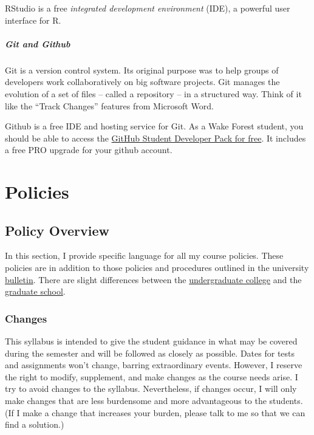 RStudio is a free \emph{integrated development environment} (IDE), a powerful user interface for R.

\hypertarget{git-and-github}{%
\subsubsection{Git and Github}\label{git-and-github}}

Git is a version control system. Its original purpose was to help groups of developers work collaboratively on big software projects. Git manages the evolution of a set of files -- called a repository -- in a structured way. Think of it like the ``Track Changes'' features from Microsoft Word.

Github is a free IDE and hosting service for Git. As a Wake Forest student, you should be able to access the \href{https://education.github.com/benefits?type=student}{GitHub Student Developer Pack for free}. It includes a free PRO upgrade for your github account.

\hypertarget{part-policies}{%
\part*{Policies}\label{part-policies}}


\hypertarget{policy-overview}{%
\chapter{Policy Overview}\label{policy-overview}}

In this section, I provide specific language for all my course policies. These policies are in addition to those policies and procedures outlined in the university \href{https://bulletin.wfu.edu}{bulletin}. There are slight differences between the \href{https://bulletin.wfu.edu/undergraduate/}{undergraduate college} and the \href{https://bulletin.wfu.edu/graduate/}{graduate school}.

\hypertarget{changes}{%
\section{Changes}\label{changes}}

This syllabus is intended to give the student guidance in what may be covered during the semester and will be followed as closely as possible.
Dates for tests and assignments won't change, barring extraordinary events.
However, I reserve the right to modify, supplement, and make changes as the course needs arise.
I try to avoid changes to the syllabus.
Nevertheless, if changes occur, I will only make changes that are less burdensome and more advantageous to the students.
(If I make a change that increases your burden, please talk to me so that we can find a solution.)

